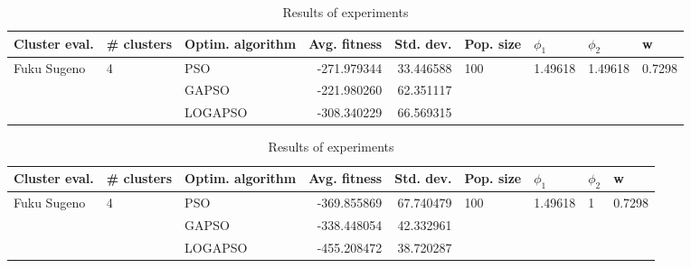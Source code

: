 \documentclass{article}
\begin{document}
\begin{table}
\centering
\caption{Results of experiments}
\begin{tabular}{lllrrllll}
\toprule
               Cluster eval. &        \# clusters & Optim. algorithm &  Avg. fitness &  Std. dev. &            Pop. size &               $\phi_{1}$ &               $\phi_{2}$ &                       w \\
\midrule
\multirow{3}{*}{Fuku Sugeno} & \multirow{3}{*}{4} &              PSO &   -271.979344 &  33.446588 & \multirow{3}{*}{100} & \multirow{3}{*}{1.49618} & \multirow{3}{*}{1.49618} & \multirow{3}{*}{0.7298} \\
                             &                    &            GAPSO &   -221.980260 &  62.351117 &                      &                          &                          &                         \\
                             &                    &          LOGAPSO &   -308.340229 &  66.569315 &                      &                          &                          &                         \\
\bottomrule
\end{tabular}
\end{table}
\begin{table}
\centering
\caption{Results of experiments}
\begin{tabular}{lllrrllll}
\toprule
               Cluster eval. &        \# clusters & Optim. algorithm &  Avg. fitness &  Std. dev. &            Pop. size &               $\phi_{1}$ &         $\phi_{2}$ &                       w \\
\midrule
\multirow{3}{*}{Fuku Sugeno} & \multirow{3}{*}{4} &              PSO &   -369.855869 &  67.740479 & \multirow{3}{*}{100} & \multirow{3}{*}{1.49618} & \multirow{3}{*}{1} & \multirow{3}{*}{0.7298} \\
                             &                    &            GAPSO &   -338.448054 &  42.332961 &                      &                          &                    &                         \\
                             &                    &          LOGAPSO &   -455.208472 &  38.720287 &                      &                          &                    &                         \\
\bottomrule
\end{tabular}
\end{table}
\end{document}
